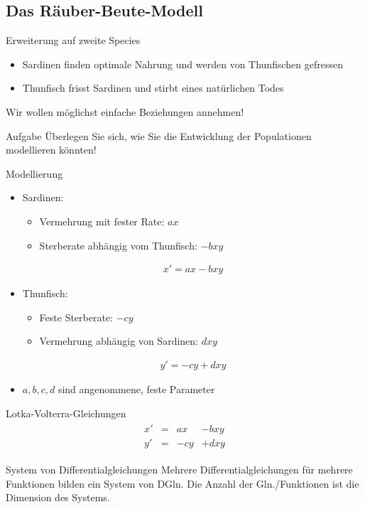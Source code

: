 \documentclass[notheorems,hidelinks,aspectratio=1610]{beamer}
\begin{document}
\subsection{Das Räuber-Beute-Modell}
\frame{\subtoc}

\begin{frame}{Erweiterung auf zweite Species}
  \begin{itemize}
  \item Sardinen finden optimale Nahrung und werden von
    Thunfischen gefressen
  \item Thunfisch frisst Sardinen und stirbt eines natürlichen
    Todes
  \end{itemize}
  \pause
  Wir wollen möglichst einfache Beziehungen annehmen!
  \begin{exampleblock}{Aufgabe}
    Überlegen Sie sich, wie Sie die Entwicklung der Populationen
    modellieren könnten!
  \end{exampleblock}
\end{frame}

\begin{frame}{Modellierung}
  \begin{itemize}
  \item<+-> Sardinen:
    \begin{itemize}
    \item Vermehrung mit fester Rate: $ax$
    \item Sterberate abhängig vom Thunfisch: $-bxy$
    \end{itemize}
    \begin{gather*}
      x' = ax-bxy
    \end{gather*}
  \item<+-> Thunfisch:
    \begin{itemize}
    \item Feste Sterberate: $-cy$
    \item Vermehrung abhängig von Sardinen: $dxy$
    \end{itemize}
    \begin{gather*}
      y' = -cy + dxy
    \end{gather*}
  \item<+-> $a,b,c,d$ sind angenommene, feste Parameter
  \end{itemize}
\end{frame}

\begin{frame}{Lotka-Volterra-Gleichungen}
  \begin{gather*}
    \begin{aligned}
      x' &=& ax &-bxy\\
      y' &=& -cy & +dxy
    \end{aligned}
  \end{gather*}

  \begin{block}{System von Differentialgleichungen}
    Mehrere Differentialgleichungen für mehrere Funktionen bilden ein
    System von DGln. Die Anzahl der Gln./Funktionen ist die Dimension
    des Systems.
  \end{block}
\end{frame}
\end{document}

